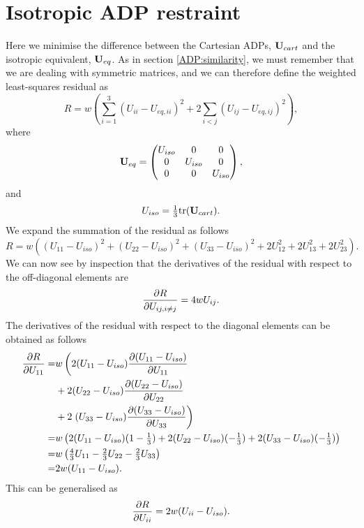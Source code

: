 \documentclass[11pt]{article}
\begin{document}
\section{Isotropic ADP restraint}
Here we minimise the difference between the Cartesian ADPs, $\mathbf{U}_{cart}$ and
the isotropic equivalent, $\mathbf{U}_{eq}$.  As in section \ref{ADP:similarity}, we
must remember that we are dealing with symmetric matrices, and we can therefore
define the weighted least-squares residual as
\begin{equation}
R = w \left( \sum_{i=1}^3 (U_{ii} - U_{eq,ii})^2 + 2 \sum_{i<j} (U_{ij} - U_{eq,ij})^2 \right) ,
\end{equation}
where
\begin{equation}
\mathbf{U}_{eq} = 
\begin{pmatrix} U_{iso} & 0 & 0\\
  0 & U_{iso} & 0\\
  0 & 0 & U_{iso}\end{pmatrix},
\end{equation}
and
\begin{equation}
U_{iso} = \tfrac{1}{3} \mathrm{tr}(\mathbf{U}_{cart}).
\end{equation}
We expand the summation of the residual as follows
\begin{equation}
R = w \left( (U_{11} - U_{iso})^2 + (U_{22} - U_{iso})^2 + (U_{33} - U_{iso})^2 + 2 U_{12}^2 + 2 U_{13}^2 + 2 U_{23}^2 \right) .
\end{equation}
We can now see by inspection that the derivatives of the residual with respect to the off-diagonal elements are
\begin{equation}
\frac{\partial R}{\partial U_{ij,i\neq j}} = 4 w U_{ij}.
\end{equation}
The derivatives of the residual with respect to the diagonal elements can be obtained as follows
\begin{align}
\frac{\partial R}{\partial U_{11}} =& w \left( 2 (U_{11} - U_{iso})\frac{\partial (U_{11} - U_{iso})}{\partial U_{11}}\right. \nonumber\\
                        &+ 2 (U_{22} - U_{iso})\frac{\partial (U_{22} - U_{iso})}{\partial U_{22}}\nonumber\\
                        &+ 2 \left. (U_{33} - U_{iso})\frac{\partial (U_{33} - U_{iso})}{\partial U_{33}} \right) \nonumber\\
                       =& w \left( 2 (U_{11} - U_{iso})(1 - \tfrac{1}{3}) + 2 (U_{22} - U_{iso})(-\tfrac{1}{3}) + 2 (U_{33} - U_{iso})(-\tfrac{1}{3}) \right) \nonumber\\
                       =& w \left( \tfrac{4}{3} U_{11} - \tfrac{2}{3} U_{22} - \tfrac{2}{3} U_{33}\right) \nonumber\\
                       =& 2 w (U_{11} - U_{iso}) .
\end{align}
This can be generalised as
\begin{equation}
\frac{\partial R}{\partial U_{ii}} = 2 w (U_{ii} - U_{iso}) .
\end{equation}


\end{document}
